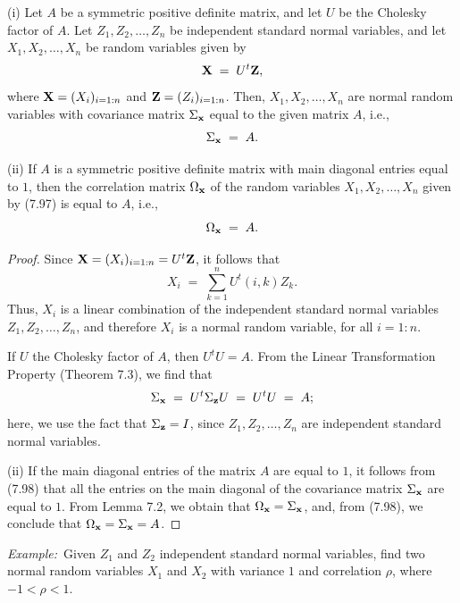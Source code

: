 
\begin{theorem}
(i) Let $A$ be a symmetric positive definite matrix, and let $U$ be the Cholesky factor of $A$.
Let $Z_1, Z_2, \ldots, Z_n$ be independent standard normal variables, and let $X_1, X_2, \ldots,
X_n$ be random variables given by
\begin{equation}
\mathbf{X} \;=\; U^t\mathbf{Z},
\end{equation}
where $\mathbf{X} = (X_i)_{i=1:n}$ and $\mathbf{Z} = (Z_i)_{i=1:n}$. Then, $X_1, X_2, \ldots, X_n$ are normal
random variables with covariance matrix $\Sigma_{\mathbf{x}}$ equal to the given matrix $A$, i.e.,
\begin{equation}
\Sigma_{\mathbf{x}} \;=\; A.
\end{equation}

(ii) If $A$ is a symmetric positive definite matrix with main diagonal entries equal to $1$,
then the correlation matrix $\Omega_{\mathbf{x}}$ of the random variables $X_1, X_2, \ldots, X_n$
given by (7.97) is equal to $A$, i.e.,
\begin{equation}
\Omega_{\mathbf{x}} \;=\; A.
\end{equation}
\end{theorem}

\begin{proof}
Since $\mathbf{X} = (X_i)_{i=1:n} = U^t\mathbf{Z}$, it follows that
\[
X_i \;=\; \sum_{k=1}^n U^t(i,k)Z_k.
\]
Thus, $X_i$ is a linear combination of the independent standard normal variables $Z_1, Z_2,
\ldots, Z_n$, and therefore $X_i$ is a normal random variable, for all $i = 1:n$.

If $U$ the Cholesky factor of $A$, then $U^tU = A$. From the Linear Transformation Property
(Theorem 7.3), we find that
\[
\Sigma_{\mathbf{x}} \;=\; U^t\Sigma_{\mathbf{z}}U \;=\; U^tU \;=\; A;
\]
here, we use the fact that $\Sigma_{\mathbf{z}} = I$, since $Z_1, Z_2, \ldots, Z_n$ are independent
standard normal variables.

(ii) If the main diagonal entries of the matrix $A$ are equal to $1$, it follows from (7.98)
that all the entries on the main diagonal of the covariance matrix $\Sigma_{\mathbf{x}}$ are equal to
$1$. From Lemma 7.2, we obtain that $\Omega_{\mathbf{x}} = \Sigma_{\mathbf{x}}$, and, from (7.98), we
conclude that $\Omega_{\mathbf{x}} = \Sigma_{\mathbf{x}} = A$.
\end{proof}

\medskip
\noindent\textit{Example:}\ Given $Z_1$ and $Z_2$ independent standard normal variables, find
two normal random variables $X_1$ and $X_2$ with variance $1$ and correlation $\rho$, where
$-1 < \rho < 1$.

